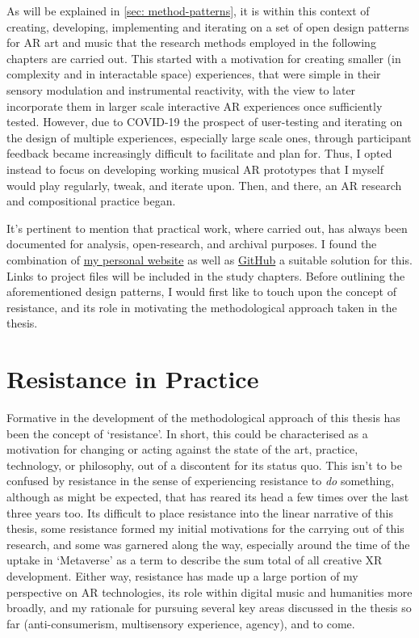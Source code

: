 As will be explained in \autoref{sec: method-patterns}, it is within this context of creating, developing, implementing and iterating on a set of open design patterns for AR art and music that the research methods employed in the following chapters are carried out. This started with a motivation for creating smaller (in complexity and in interactable space) experiences, that were simple in their sensory modulation and instrumental reactivity, with the view to later incorporate them in larger scale interactive AR experiences once sufficiently tested. However, due to COVID-19 the prospect of user-testing and iterating on the design of multiple experiences, especially large scale ones, through participant feedback became increasingly difficult to facilitate and plan for. Thus, I opted instead to focus on developing working musical AR prototypes that I myself would play regularly, tweak, and iterate upon. Then, and there, an AR research and compositional practice began.

It's pertinent to mention that practical work, where carried out, has always been documented for analysis, open-research, and archival purposes. I found the combination of \href{https://sambilbow.github.io}{my personal website} as well as \href{https://github.com/sambilbow}{GitHub} a suitable solution for this. Links to project files will be included in the study chapters. Before outlining the aforementioned design patterns, I would first like to touch upon the concept of resistance, and its role in motivating the methodological approach taken in the thesis.



\section{Resistance in Practice}
Formative in the development of the methodological approach of this thesis has been the concept of `resistance'. In short, this could be characterised as a motivation for changing or acting against the state of the art, practice, technology, or philosophy, out of a discontent for its status quo. This isn't to be confused by resistance in the sense of experiencing resistance to \textit{do} something, although as might be expected, that has reared its head a few times over the last three years too. Its difficult to place resistance into the linear narrative of this thesis, some resistance formed my initial motivations for the carrying out of this research, and some was garnered along the way, especially around the time of the uptake in `Metaverse' as a term to describe the sum total of all creative XR development. Either way, resistance has made up a large portion of my perspective on AR technologies, its role within digital music and humanities more broadly, and my rationale for pursuing several key areas discussed in the thesis so far (anti-consumerism, multisensory experience, agency), and to come.

